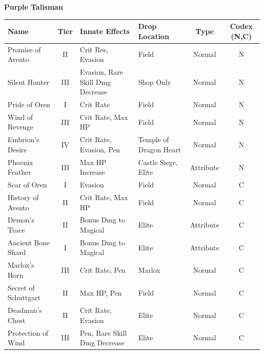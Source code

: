 \documentclass[]{article}
\begin{document}
\begin{center}

\textbf{Purple Talisman}

\begin{tabular}{|>{\centering}m{4cm}|c|>{\centering}m{4cm}|>{\centering}m{3cm}|c|c|}
	\hline 
	Name & Tier & Innate Effects & Drop Location & Type&Codex (N,C) \\ 
	\hline 
	Promise of Avento & II & Crit Res, Evasion & Field & Normal &N\\ 
	Silent Hunter & III & Evasion, Rare Skill Dmg Decrease & Shop Only & Normal &N\\ 
	Pride of Oren & I & Crit Rate & Field & Normal &N\\ 
	Wind of Revenge & III & Crit Rate, Max HP & Field & Normal&N \\ 
	Embrion's Desire & IV & Crit Rate, Evasion, Pen & Temple of Dragon Heart & Normal &N\\ 
	Phoenix Feather & III & Max HP Increase & Castle Siege, Elite & Attribute &N\\
	
	Scar of Oren & I & Evasion & Field & Normal & C\\
	
	History of Avento & II & Crit Rate, Max HP & Field & Normal & C\\
	
	Demon's Trace & II & Bonus Dmg to Magical & Elite & Attribute & C\\
	
	Ancient Bone Shard & I & Bonus Dmg to Magical & Elite & Attribute& C\\
	
	Marlox's Horn & III & Crit Rate, Pen & Marlox & Normal & C\\
	
	Secret of Schuttgart & II & Max HP, Pen & Field & Normal & C\\
	
	Deadman's Chest & II & Crit Rate, Evasion & Elite & Normal & C\\
	
	Protection of Wind & III & Pen, Rare Skill Dmg Decrease & Elite & Normal & C\\
	 
	\hline 
\end{tabular} 


\end{center}
\end{document}
